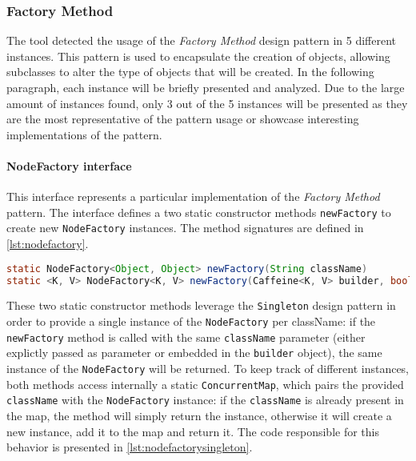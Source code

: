 \subsubsection{Factory Method}

The tool detected the usage of the \textit{Factory Method} design pattern in 5 different instances. This pattern is used to encapsulate the creation of objects, allowing subclasses to alter the type of objects that will be created. In the following paragraph, each instance will be briefly presented and analyzed. Due to the large amount of instances found, only 3 out of the 5 instances will be presented as they are the most representative of the pattern usage or showcase interesting implementations of the pattern.

\paragraph{NodeFactory interface} This interface represents a particular implementation of the \textit{Factory Method} pattern. The interface defines a two static constructor methods \texttt{newFactory} to create new \texttt{NodeFactory} instances. The method signatures are defined in \autoref{lst:nodefactory}.

\begin{lstlisting}[language=Java, caption={NodeFactory interface static constructor methods}, captionpos=b, label={lst:nodefactory}]
static NodeFactory<Object, Object> newFactory(String className)
static <K, V> NodeFactory<K, V> newFactory(Caffeine<K, V> builder, boolean isAsync)
\end{lstlisting}

\noindent These two static constructor methods leverage the \texttt{Singleton} design pattern in order to provide a single instance of the \texttt{NodeFactory} per className: if the \texttt{newFactory} method is called with the same \texttt{className} parameter (either explictly passed as parameter or embedded in the \texttt{builder} object), the same instance of the \texttt{NodeFactory} will be returned. To keep track of different instances, both methods access internally a static \texttt{ConcurrentMap}, which pairs the provided \texttt{className} with the \texttt{NodeFactory} instance: if the \texttt{className} is already present in the map, the method will simply return the instance, otherwise it will create a new instance, add it to the map and return it. The code responsible for this behavior is presented in \autoref{lst:nodefactorysingleton}.

